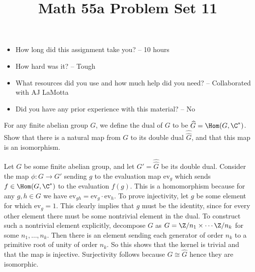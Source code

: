 \documentclass[11pt,letterpaper]{article}
\title{\textbf{Math 55a Problem Set 11}}
\begin{document}
\maketitle
\setcounter{page}{0}
\thispagestyle{empty}

\begin{itemize}
  \item How long did this assignment take you? -- 10 hours
  \item How hard was it? -- Tough
  \item What resources did you use and how much help did you need? -- Collaborated with AJ LaMotta
  \item Did you have any prior experience with this material? -- No
\end{itemize}

\pagebreak
\begin{problem}
    For any finite abelian group $G$, we define the dual of $G$ to be $\widehat{G}=\Hom(G,\C^*)$. Show that there is a natural map from $G$ to its double dual $\widehat{\widehat{G}}$, and that this map is an isomorphism.
\end{problem}

Let $G$ be some finite abelian group, and let $G' = \widehat{\widehat{G}}$ be its double dual. Consider the map $\phi : G \to G'$ sending $g$ to the evaluation map $\mathrm{ev}_g$ which sends $f\in \Hom(G,\C^*)$ to the evaluation $f(g)$. This is a homomorphism because for any $g,h\in G$ we have $\mathrm{ev}_{gh}=\mathrm{ev}_g\cdot\mathrm{ev}_h$. To prove injectivity, let $g$ be some element for which $\mathrm{ev}_g=1$. This clearly implies that $g$ must be the identity, since for every other element there must be some nontrivial element in the dual. To construct such a nontrivial element explicitly, decompose $G$ as $G = \Z/n_1\times \cdots \Z/n_k$ for some $n_1,\ldots,n_k$. Then there is an element sending each generator of order $n_k$ to a primitive root of unity of order $n_k$. So this shows that the kernel is trivial and that the map is injective. Surjectivity follows because $G\cong \widehat{G}$ hence they are isomorphic.
\end{document}
